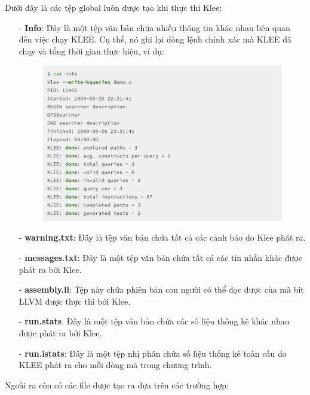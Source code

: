 \documentclass[12pt,a4paper]{article}
\begin{document}
Dưới đây là các tệp global luôn được tạo khi thực thi Klee:

\begin{itemize}
\item[-] \textbf{Info}: Đây là một tệp văn bản chứa nhiều thông tin khác nhau liên quan đến việc chạy KLEE. Cụ thể, nó ghi lại dòng lệnh chính xác mà KLEE đã chạy và tổng thời gian thực hiện, ví dụ:

\begin{figure}[ht]
\begin{center}
\includegraphics[scale=.3]{hinhanh/fileinfo.png}
\end{center}
\end{figure}

\item[-] \textbf{warning.txt}: Đây là tệp văn bản chứa tất cả các cảnh báo do Klee phát ra.
\item[-] \textbf{messages.txt}: Đây là một tệp văn bản chứa tất cả các tin nhắn khác được phát ra bởi Klee.
\item[-] \textbf{assembly.ll}: Tệp này chứa phiên bản con người có thể đọc được của mã bit LLVM được thực thi bởi Klee. 
\item[-] \textbf{run.stats}: Đây là một tệp văn bản chứa các số liệu thống kê khác nhau được phát ra bởi Klee.
\item[-] \textbf{run.istats}: Đây là một tệp nhị phân chứa số liệu thống kê toàn cầu do KLEE phát ra cho mỗi dòng mã trong chương trình.
\end{itemize}

Ngoài ra còn có các file được tạo ra dựa trên các trường hợp:
\end{document}
